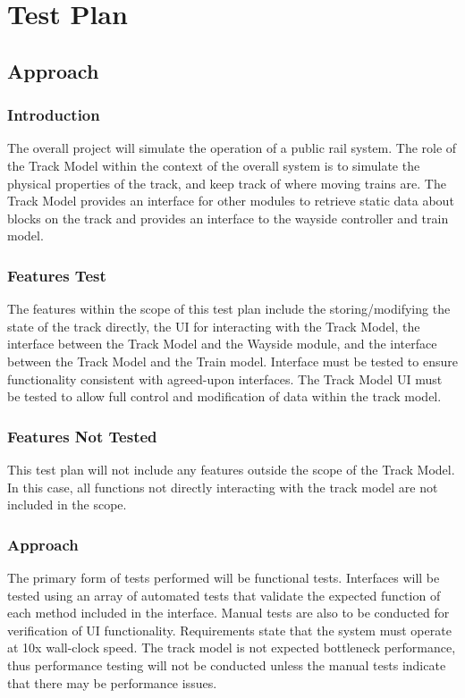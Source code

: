 \documentclass{scrreprt}
\begin{document}
\section{Test Plan}

\subsection{Approach}

\subsubsection{Introduction}
The overall project will simulate the operation of a public rail system. The role of the Track Model within the context of the overall system is to simulate the physical properties of the track, and keep track of where moving trains are. The Track Model provides an interface for other modules to retrieve static data about blocks on the track and provides an interface to the wayside controller and train model.

\subsubsection{Features Test}
The features within the scope of this test plan include the storing/modifying the state of the track directly, the UI for interacting with the Track Model, the interface between the Track Model and the Wayside module, and the interface between the Track Model and the Train model. Interface must be tested to ensure functionality consistent with agreed-upon interfaces. The Track Model UI must be tested to allow full control and modification of data within the track model.

\subsubsection{Features Not Tested}
This test plan will not include any features outside the scope of the Track Model. In this case, all functions not directly interacting with the track model are not included in the scope.

\subsubsection{Approach}
The primary form of tests performed will be functional tests. Interfaces will be tested using an array of automated tests that validate the expected function of each method included in the interface. Manual tests are also to be conducted for verification of UI functionality. Requirements state that the system must operate at 10x wall-clock speed. The track model is not expected bottleneck performance, thus performance testing will not be conducted unless the manual tests indicate that there may be performance issues.
\end{document}
